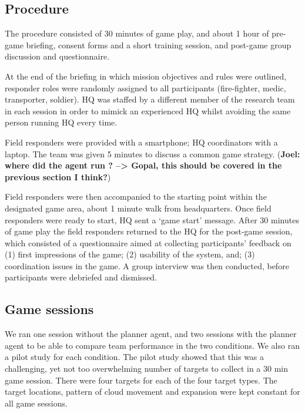 \subsection{Procedure}
The procedure consisted of 30 minutes of game play, and about 1 hour of pre-game briefing, consent forms and a short training session, and post-game group discussion and questionnaire. 


At the end of the briefing in which mission objectives and rules were outlined, responder roles were randomly assigned to all participants (fire-fighter, medic, transporter, soldier). HQ was staffed by a different member of the research team in each session in order to mimick an experienced HQ whilst avoiding the same person running HQ every time. 

Field responders were provided with a smartphone; HQ coordinators with a laptop. The team was given 5 minutes to discuss a common game strategy. (\textbf{Joel: where did the agent run ? --> Gopal, this should be covered in the previous section I think?})

Field responders were then accompanied to the starting point within the designated game area, about 1 minute walk from headquarters. Once field responders were ready to start, HQ sent a `game start' message. After 30 minutes of game play the field responders returned to the HQ for the post-game session, which consisted of a questionnaire aimed at collecting participants' feedback on (1) first impressions of the game; (2) usability of the system, and; (3) coordination issues in the game. A group interview was then conducted, before participants were debriefed and dismissed.

\subsection{Game sessions}
We ran one session without the planner agent, and two sessions with the planner agent to be able to compare team performance in the two conditions. We also ran a pilot study for each condition. The pilot study showed that this was a challenging, yet not too overwhelming number of targets to collect in a 30 min game session. There were four targets for each of the four target types.
The target locations, pattern of cloud movement and expansion were kept constant for all game sessions. 


